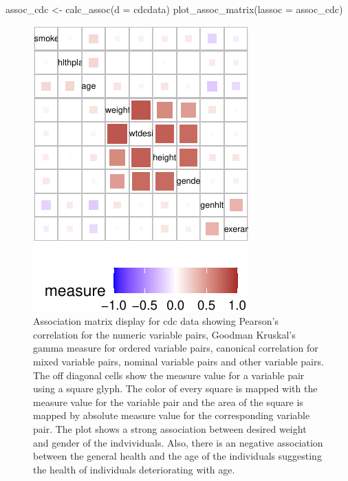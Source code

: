 \begin{Schunk}
\begin{Sinput}
assoc_cdc <- calc_assoc(d = cdcdata)
plot_assoc_matrix(lassoc = assoc_cdc)
\end{Sinput}
\begin{figure}

{\centering \includegraphics{rj_paper_files/figure-latex/assoc-matrix-cdcdata-1} 

}

\caption[Association matrix display for cdc data showing Pearson's correlation for the numeric variable pairs, Goodman Kruskal's gamma measure for ordered variable pairs, canonical correlation for mixed variable pairs, nominal variable pairs and other variable pairs]{Association matrix display for cdc data showing Pearson's correlation for the numeric variable pairs, Goodman Kruskal's gamma measure for ordered variable pairs, canonical correlation for mixed variable pairs, nominal variable pairs and other variable pairs. The off diagonal cells show the measure value for a variable pair using a square glyph. The color of every square is mapped with the measure value for the variable pair and the area of the square is mapped by absolute measure value for the corresponding variable pair. The plot shows a strong association between desired weight and gender of the indvividuals. Also, there is an negative association between the general health and the age of the individuals suggesting the health of individuals deteriorating with age.}\label{fig:assoc-matrix-cdcdata}
\end{figure}
\end{Schunk}

